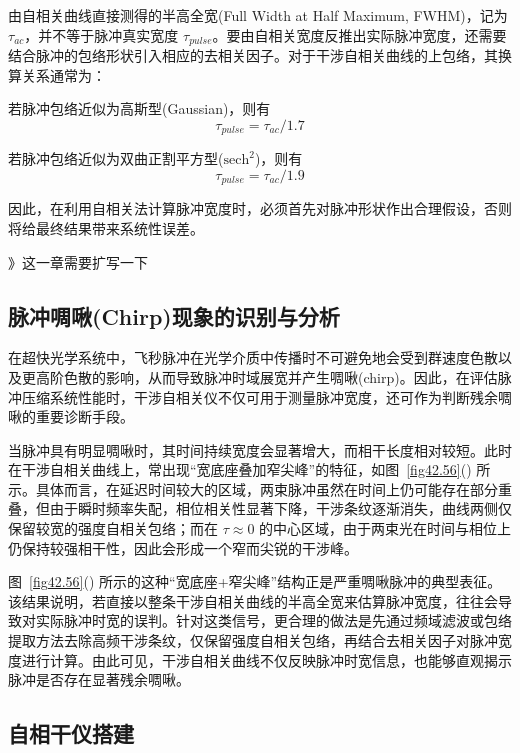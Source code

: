 由自相关曲线直接测得的半高全宽(Full Width at Half Maximum, FWHM)，记为 $\tau_{ac}$，并不等于脉冲真实宽度 $\tau_{pulse}$。要由自相关宽度反推出实际脉冲宽度，还需要结合脉冲的包络形状引入相应的去相关因子。对于干涉自相关曲线的上包络，其换算关系通常为：

若脉冲包络近似为高斯型(Gaussian)，则有
\begin{equation}
    \tau_{pulse}=\tau_{ac}/1.7
\end{equation}

若脉冲包络近似为双曲正割平方型($\mathrm{sech}^2$)，则有
\begin{equation}
\tau_{pulse}=\tau_{ac}/1.9
\end{equation}

因此，在利用自相关法计算脉冲宽度时，必须首先对脉冲形状作出合理假设，否则将给最终结果带来系统性误差。

》这一章需要扩写一下



\subsection{脉冲啁啾(Chirp)现象的识别与分析}\label{6.1.3}

在超快光学系统中，飞秒脉冲在光学介质中传播时不可避免地会受到群速度色散以及更高阶色散的影响，从而导致脉冲时域展宽并产生啁啾(chirp)。因此，在评估脉冲压缩系统性能时，干涉自相关仪不仅可用于测量脉冲宽度，还可作为判断残余啁啾的重要诊断手段。

当脉冲具有明显啁啾时，其时间持续宽度会显著增大，而相干长度相对较短。此时在干涉自相关曲线上，常出现``宽底座叠加窄尖峰''的特征，如图~\ref{fig42.56}() 所示。具体而言，在延迟时间较大的区域，两束脉冲虽然在时间上仍可能存在部分重叠，但由于瞬时频率失配，相位相关性显著下降，干涉条纹逐渐消失，曲线两侧仅保留较宽的强度自相关包络；而在 $\tau \approx 0$ 的中心区域，由于两束光在时间与相位上仍保持较强相干性，因此会形成一个窄而尖锐的干涉峰。

图~\ref{fig42.56}() 所示的这种``宽底座+窄尖峰''结构正是严重啁啾脉冲的典型表征。该结果说明，若直接以整条干涉自相关曲线的半高全宽来估算脉冲宽度，往往会导致对实际脉冲时宽的误判。针对这类信号，更合理的做法是先通过频域滤波或包络提取方法去除高频干涉条纹，仅保留强度自相关包络，再结合去相关因子对脉冲宽度进行计算。由此可见，干涉自相关曲线不仅反映脉冲时宽信息，也能够直观揭示脉冲是否存在显著残余啁啾。



\subsection{自相干仪搭建}\label{6.1.4}

